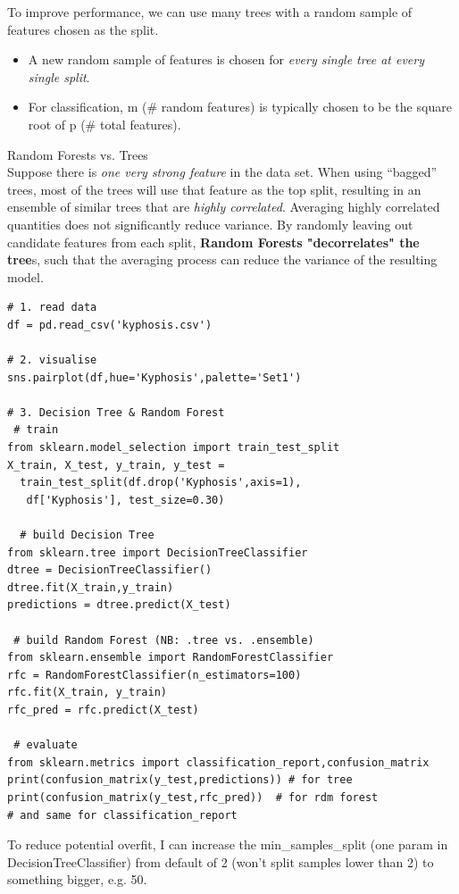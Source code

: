 \documentclass[11pt]{article}
\begin{document}
To improve performance, we can use many trees with a random sample of features chosen as the split.
\begin{itemize}
	\item  A new random sample of features is chosen for \textit{every single tree at every single split}.
	\item For classification, m (\# random features) is typically chosen to be the square root of p (\# total features).
\end{itemize}

Random Forests vs. Trees \\
Suppose there is \textit{one very strong feature} in the data set. When using “bagged” trees, most of the trees will use that feature as the top split, resulting in an ensemble of similar trees that are \textit{highly correlated}. Averaging highly correlated quantities does not significantly reduce variance. By randomly leaving out candidate features from each split, \textbf{Random Forests "decorrelates" the tree}s, such that the averaging process can reduce the variance of the resulting model.

\begin{lstlisting}
# 1. read data
df = pd.read_csv('kyphosis.csv')

# 2. visualise 
sns.pairplot(df,hue='Kyphosis',palette='Set1')

# 3. Decision Tree & Random Forest
 # train
from sklearn.model_selection import train_test_split
X_train, X_test, y_train, y_test = 
  train_test_split(df.drop('Kyphosis',axis=1),
   df['Kyphosis'], test_size=0.30)
  
  # build Decision Tree
from sklearn.tree import DecisionTreeClassifier
dtree = DecisionTreeClassifier()
dtree.fit(X_train,y_train)
predictions = dtree.predict(X_test)

 # build Random Forest (NB: .tree vs. .ensemble)
from sklearn.ensemble import RandomForestClassifier
rfc = RandomForestClassifier(n_estimators=100)
rfc.fit(X_train, y_train)
rfc_pred = rfc.predict(X_test)

 # evaluate
from sklearn.metrics import classification_report,confusion_matrix
print(confusion_matrix(y_test,predictions)) # for tree
print(confusion_matrix(y_test,rfc_pred))  # for rdm forest
# and same for classification_report
\end{lstlisting}

To reduce potential overfit, I can increase the min\_samples\_split (one param in DecisionTreeClassifier) from default of 2 (won't split samples lower than 2) to something bigger, e.g. 50.
\end{document}
